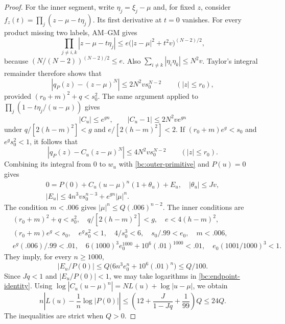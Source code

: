 \documentclass[11pt,reqno]{amsart}
\numberwithin{equation}{section}
\theoremstyle{definition}
\theoremstyle{remark}
\begin{document}
\begin{proof}
For the inner segment, write $\eta_j=\xi_j-\mu$ and, for fixed $z$,
consider
$f_z(t)=\prod_j(z-\mu-t\eta_j)$.  Its first derivative at $t=0$
vanishes.  For every product missing two labels, AM--GM gives
\[
 \prod_{j\ne i,k}|z-\mu-t\eta_j|
 \leq e\bigl(|z-\mu|^2+t^2v\bigr)^{(N-2)/2},
\]
because $(N/(N-2))^{(N-2)/2}\leq e$.  Also
$\sum_{i\ne k}|\eta_i\eta_k|\leq N^2v$.
Taylor's integral remainder therefore shows that
\[
 |q_P(z)-(z-\mu)^N|\leq2N^2vs_0^{N-2}
 \qquad(|z|\leq r_0),
\]
provided $(r_0+m)^2+q<s_0^2$.  The same argument applied to
$\prod_j(1-t\eta_j/(u-\mu))$ gives
\[
 |C_u|\leq e^{gn},\qquad
 |C_u-1|\leq2N^2ve^{gn}
\]
under $q/[2(h-m)^2]<g$ and $e/[2(h-m)^2]<2$.
If $(r_0+m)e^g<s_0$ and $e^gs_0^2<1$, it follows that
\[
 |q_P(z)-C_u(z-\mu)^N|\leq4N^2vs_0^{N-2}
 \qquad(|z|\leq r_0).
\]
Combining its integral from $0$ to $w_u$ with
\eqref{bc:outer-primitive} and $P(u)=0$ gives
\begin{equation}\label{bc:endpoint-identity}
\begin{gathered}
 0=P(0)+C_u(u-\mu)^n(1+\theta_u)+E_u,\quad
 |\theta_u|\leq Jv,\\
 |E_u|\leq4n^3vs_0^{n-3}+e^{gn}|\mu|^n.
\end{gathered}
\end{equation}
The condition $m<.006$ gives $|\mu|^n\leq Q(.006)^{n-2}$.
The inner conditions are
\begin{align}
 &(r_0+m)^2+q<s_0^2,\quad
   q/[2(h-m)^2]<g,\quad e<4(h-m)^2,\nonumber\\
 &(r_0+m)e^g<s_0,\quad e^gs_0^2<1,\quad
   4/s_0^3<6,\quad s_0/.99<e_0,\quad m<.006,\nonumber\\
 &e^g(.006)/.99<.01,\quad
   6(1000)^3e_0^{1000}+10^6(.01)^{1000}<.01,\quad
   e_0(1001/1000)^3<1.                            \label{bc:inner-gates}
\end{align}
They imply, for every $n\geq1000$,
\begin{equation}\label{bc:Q-error}
 |E_u/P(0)|\leq Q\bigl(6n^3e_0^n+10^6(.01)^n\bigr)\leq Q/100.
\end{equation}
Since $Jq<1$ and $|E_u/P(0)|<1$, we may take logarithms in
\eqref{bc:endpoint-identity}.  Using
$\log|C_u(u-\mu)^n|=NL(u)+\log|u-\mu|$, we obtain
\[
 n\left|L(u)-\frac1n\log|P(0)|\right|
 \leq\left(12+\frac J{1-Jq}+\frac1{99}\right)Q\leq24Q.
\]
The inequalities are strict when $Q>0$.


\end{proof}
\end{document}
